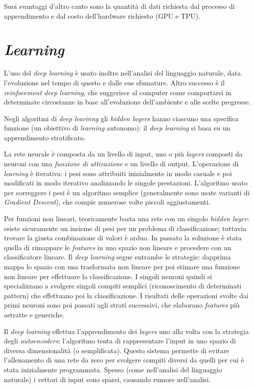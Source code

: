 \documentclass[11pt, a4page]{article}
\begin{document}
Suoi svantaggi d'altro canto sono la quantità di dati richiesta dal processo di apprendimento e dal costo dell'hardware richiesto (GPU e TPU).

\section{\textit{Learning}}
L'uso del \textit{deep learning} è usato inoltre nell'analisi del linguaggio naturale, data l'evoluzione nel tempo di questo e dalle sue sfumature.
Altro successo è il \textit{reinfocement deep learning}, che suggerisce al computer come comportarsi in determinate circostanze in base all'evoluzione dell'ambiente e alle scelte pregresse. \newline

Negli algoritmi di \textit{deep learinng} gli \textit{hidden layers} hanno ciascuno una specifica funzione (un obiettivo di \textit{learning} autonomo): il \textit{deep learning} si basa su un apprendimento stratificato.

La rete neurale è composta da un livello di input, uno o più \textit{layers} composti da neuroni con una \textit{funzione di attivazione} e un livello di output.
L'operazione di \textit{learning} è iterativa: i pesi sono attribuiti inizialmente in modo casuale e poi modificati in modo iterativo analizzando le singole prestazioni.
L'algoritmo usato per correggere i pesi è un algoritmo semplice (generalmente sono usate varianti di \textit{Gradient Descent}), che compie numerose volte piccoli aggiustamenti.

Per funzioni non lineari, teoricamente basta una rete con un singolo \textit{hidden layer}: esiste sicuramente un insieme di pesi per un problema di classificazione; tuttavia trovare la giusta combinazione di valori è arduo.
In passato la soluzione è stata quella di rimappare le \textit{features} in uno spazio non lineare e procedere con un classificatore lineare.
Il \textit{deep learning} segue entrambe le strategie: dapprima mappa lo spazio con una trasformata non lineare per poi stimare una funzione non lineare per effettuare la classificazione.
I singoli neuroni quindi si specializzano a svolgere singoli compiti semplici (riconoscimento di determinati pattern) che effettuano poi la classificazione.
I risultati delle operazioni svolte dai primi neuroni sono poi passati agli strati successivi, che elaborano \textit{features} più astratte e generiche.

Il \textit{deep learning} effettua l'apprendimento dei \textit{layers} uno alla volta con la strategia degli \textit{autoencoders}: l'algoritmo tenta di rappresentare l'input in uno spazio di diversa dimensionalità (o semplificata).
Questo sistema permette di evitare l'allenamento di una rete da zero per svolgere compiti diversi da quelli per cui è stata inizialmente programmata.
Spesso (come nell'analisi del linguaggio naturale) i vettori di input sono sparsi, causando rumore nell'analisi.
\end{document}
